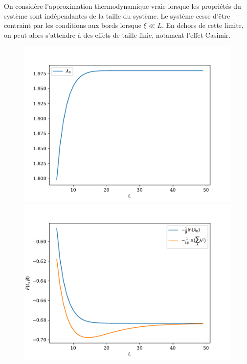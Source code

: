 On considère l'approximation thermodynamique vraie lorsque les propriétés du système sont indépendantes de la taille du système. Le système cesse d'être contraint par les conditions aux bords lorsque $\xi \ll L$. En dehors de cette limite, on peut alors s'attendre à des effets de taille finie, notament l'effet Casimir.

\begin{figure}
	\begin{minipage}[t]{0.4\linewidth}
		\includegraphics[width=\linewidth]{chap4/freeene-lambda0-mu.pdf}
	\end{minipage}%
	\begin{minipage}[t]{0.4\linewidth}
		\includegraphics[width=\linewidth]{chap4/freeene-thermo-mu.pdf}

\end{minipage}
\end{figure}
